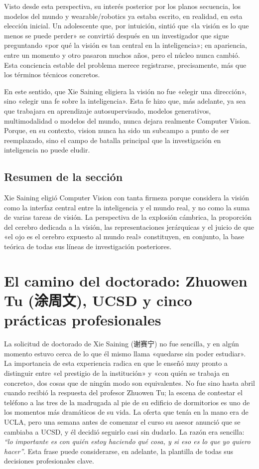 \documentclass[a4paper,12pt]{article}
\begin{document}
Visto desde esta perspectiva, su interés posterior por los planos secuencia, los modelos del mundo y wearable/robotics ya estaba escrito, en realidad, en esta elección inicial. Un adolescente que, por intuición, sintió que «la visión es lo que menos se puede perder» se convirtió después en un investigador que sigue preguntando «por qué la visión es tan central en la inteligencia»; en apariencia, entre un momento y otro pasaron muchos años, pero el núcleo nunca cambió. Esta conciencia estable del problema merece registrarse, precisamente, más que los términos técnicos concretos.

En este sentido, que Xie Saining eligiera la visión no fue «elegir una dirección», sino «elegir una fe sobre la inteligencia». Esta fe hizo que, más adelante, ya sea que trabajara en aprendizaje autosupervisado, modelos generativos, multimodalidad o modelos del mundo, nunca dejara realmente Computer Vision. Porque, en su contexto, vision nunca ha sido un subcampo a punto de ser reemplazado, sino el campo de batalla principal que la investigación en inteligencia no puede eludir.

\subsection{Resumen de la sección}

Xie Saining eligió Computer Vision con tanta firmeza porque considera la visión como la interfaz central entre la inteligencia y el mundo real, y no como la suma de varias tareas de visión. La perspectiva de la explosión cámbrica, la proporción del cerebro dedicada a la visión, las representaciones jerárquicas y el juicio de que «el ojo es el cerebro expuesto al mundo real» constituyen, en conjunto, la base teórica de todas sus líneas de investigación posteriores.

\section{El camino del doctorado: Zhuowen Tu (涂周文), UCSD y cinco prácticas profesionales}

La solicitud de doctorado de Xie Saining (谢赛宁) no fue sencilla, y en algún momento estuvo cerca de lo que él mismo llama «quedarse sin poder estudiar». La importancia de esta experiencia radica en que le enseñó muy pronto a distinguir entre «el prestigio de la institución» y «con quién se trabaja en concreto», dos cosas que de ningún modo son equivalentes. No fue sino hasta abril cuando recibió la respuesta del profesor Zhuowen Tu; la escena de contestar el teléfono a las tres de la madrugada al pie de su edificio de dormitorios es uno de los momentos más dramáticos de su vida. La oferta que tenía en la mano era de UCLA, pero una semana antes de comenzar el curso su asesor anunció que se cambiaba a UCSD, y él decidió seguirlo casi sin dudarlo. La razón era sencilla: \textit{``lo importante es con quién estoy haciendo qué cosa, y si eso es lo que yo quiero hacer''}. Esta frase puede considerarse, en adelante, la plantilla de todas sus decisiones profesionales clave.
\end{document}
